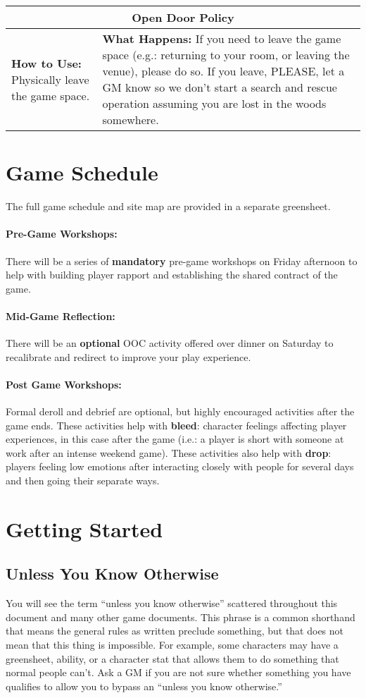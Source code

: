 \documentclass[sheet]{GL2020}
\begin{document}
\begin{tabularx}{\textwidth}{| m{4cm} | X |}
\hline
\hline
	\multicolumn{2}{|c|}{\textbf{Open Door Policy}}\\
\hline
	\textbf{How to Use:} Physically leave the game space. & \textbf{What Happens:} If you need to leave the game space (e.g.: returning to your room, or leaving the venue), please do so. If you leave, PLEASE, let a GM know so we don't start a search and rescue operation assuming you are lost in the woods somewhere. \\
\hline
\end{tabularx}

\section{Game Schedule}
The full game schedule and site map are provided in a separate greensheet. 

\paragraph{Pre-Game Workshops:} There will be a series of \textbf{mandatory} pre-game workshops on Friday afternoon to help with building player rapport and establishing the shared contract of the game.

\paragraph{Mid-Game Reflection:} There will be an \textbf{optional} OOC activity offered over dinner on Saturday to recalibrate and redirect to improve your play experience.

\paragraph{Post Game Workshops:} Formal deroll and debrief are optional, but highly encouraged activities after the game ends. These activities help with \textbf{bleed}: character feelings affecting player experiences, in this case after the game (i.e.: a player is short with someone at work after an intense weekend game). These activities also help with \textbf{drop}: players feeling low emotions after interacting closely with people for several days and then going their separate ways.

\section{Getting Started}
\subsection{Unless You Know Otherwise}
You will see the term ``unless you know otherwise'' scattered throughout this document and many other game documents. This phrase is a common shorthand that means the general rules as written preclude something, but that does not mean that this thing is impossible. For example, some characters may have a greensheet, ability, or a character stat that allows them to do something that normal people can't. Ask a GM if you are not sure whether something you have qualifies to allow you to bypass an ``unless you know otherwise.''
\end{document}
